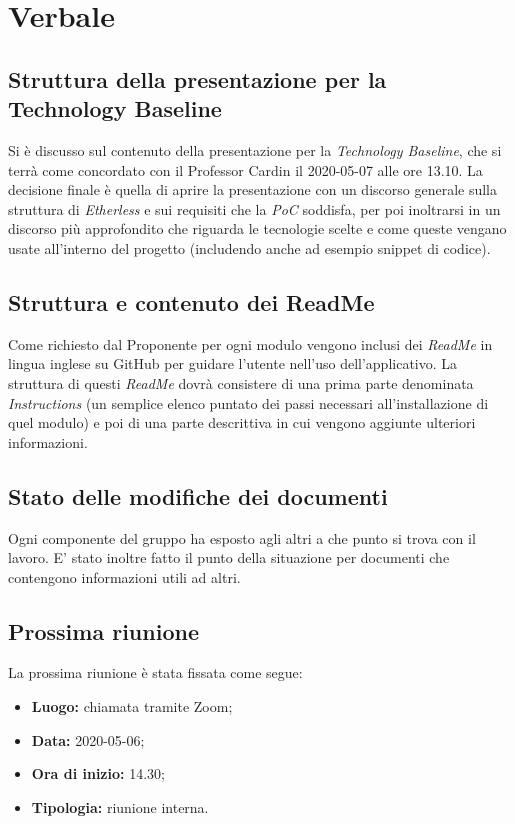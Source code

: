 \section{Verbale}
	
	\subsection{Struttura della presentazione per la Technology Baseline}
	Si è discusso sul contenuto della presentazione per la \textit{Technology Baseline}, che si terrà come concordato con il Professor Cardin il 2020-05-07 alle ore 13.10. La decisione finale è quella di aprire la presentazione con un discorso generale sulla struttura di \textit{Etherless} e sui requisiti che la \textit{PoC} soddisfa, per poi inoltrarsi in un discorso più approfondito che riguarda le tecnologie scelte e come queste vengano usate all'interno del progetto (includendo anche ad esempio snippet di codice).
	
	\subsection{Struttura e contenuto dei ReadMe}
	Come richiesto dal Proponente per ogni modulo vengono inclusi dei \textit{ReadMe} in lingua inglese su GitHub per guidare l'utente nell'uso dell'applicativo. La struttura di questi \textit{ReadMe} dovrà consistere di una prima parte denominata \textit{Instructions} (un semplice elenco puntato dei passi necessari all'installazione di quel modulo) e poi di una parte descrittiva in cui vengono aggiunte ulteriori informazioni.
	
		\subsection{Stato delle modifiche dei documenti}
	Ogni componente del gruppo ha esposto agli altri a che punto si trova con il lavoro. E' stato inoltre fatto il punto della situazione per documenti che contengono informazioni utili ad altri.
			
	\subsection{Prossima riunione}
		La prossima riunione è stata fissata come segue:
		\begin{itemize}
			\item{\textbf{Luogo: } chiamata tramite Zoom; }
			\item{\textbf{Data: } 2020-05-06;}
			\item{\textbf{Ora di inizio: } 14.30;}
			\item{\textbf{Tipologia: } riunione interna.}
		\end{itemize}

